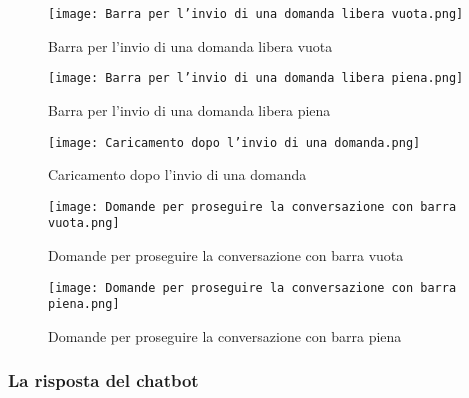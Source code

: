 \begin{figure}[h]
    \centering
        \texttt{[image: Barra per l'invio di una domanda libera vuota.png]}
        \caption{Barra per l'invio di una domanda libera vuota}
        \label{fig:Barra per l'invio di una domanda libera vuota}        
\end{figure}
\begin{figure}[h]
    \centering
        \texttt{[image: Barra per l'invio di una domanda libera piena.png]}
        \caption{Barra per l'invio di una domanda libera piena}
        \label{fig:Barra per l'invio di una domanda libera piena}        
\end{figure}

\newpage

\begin{figure}[h]
    \centering
        \texttt{[image: Caricamento dopo l'invio di una domanda.png]}
        \caption{Caricamento dopo l'invio di una domanda}
        \label{fig:Caricamento dopo l'invio di una domanda}
\end{figure}
\begin{figure}[h]
    \centering
        \texttt{[image: Domande per proseguire la conversazione con barra vuota.png]}
        \caption{Domande per proseguire la conversazione con barra vuota}
        \label{fig:Domande per proseguire la conversazione con barra vuota}        
\end{figure}
\begin{figure}[h]
    \centering
        \texttt{[image: Domande per proseguire la conversazione con barra piena.png]}
        \caption{Domande per proseguire la conversazione con barra piena}
        \label{fig:Domande per proseguire la conversazione con barra piena}        
\end{figure}


 
\subsubsection{La risposta del chatbot}  
\label{subsec:la_risposta_del_chatbot}  

